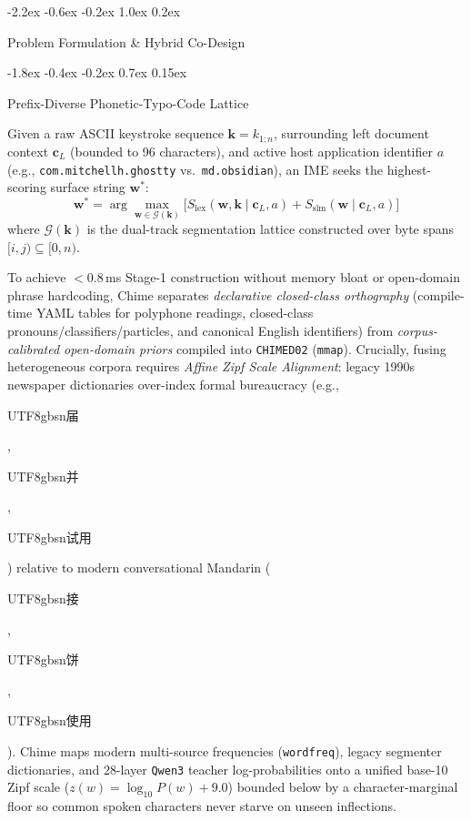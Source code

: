 \documentclass[10pt,twocolumn,letterpaper]{article}
\makeatletter
\newcommand{\zh}[1]{\begin{CJK*}{UTF8}{gbsn}{\small #1}\end{CJK*}}
\newcommand{\zh}[1]{#1}
\renewcommand\section{\@startsection {section}{1}{\z@}%
  {-2.2ex \@plus -0.6ex \@minus -0.2ex}%
  {1.0ex \@plus 0.2ex}%
  {\normalfont\large\bfseries\raggedright}}
\renewcommand\subsection{\@startsection{subsection}{2}{\z@}%
  {-1.8ex \@plus -0.4ex \@minus -0.2ex}%
  {0.7ex \@plus 0.15ex}%
  {\normalfont\normalsize\fontsize{10.8}{13}\selectfont\bfseries\raggedright}}
\makeatother
\begin{document}
\section{Problem Formulation \& Hybrid Co-Design}\label{sec:formulation}

\subsection{Prefix-Diverse Phonetic-Typo-Code Lattice}

Given a raw ASCII keystroke sequence $\bm{k} = k_{1:n}$, surrounding left document context $\bm{c}_L$ (bounded to 96 characters), and active host application identifier $a$ (e.g., \texttt{com.mitchellh.ghostty} vs.\ \texttt{md.obsidian}), an IME seeks the highest-scoring surface string $\bm{w}^*$:
\begin{equation}\label{eq:joint}
  \bm{w}^* = \arg\max_{\bm{w} \in \mathcal{G}(\bm{k})} \Big[ S_{\text{lex}}(\bm{w}, \bm{k} \mid \bm{c}_L, a) + S_{\text{slm}}(\bm{w} \mid \bm{c}_L, a) \Big]
\end{equation}
where $\mathcal{G}(\bm{k})$ is the dual-track segmentation lattice constructed over byte spans $[i, j) \subseteq [0, n)$.

To achieve $< 0.8$\,ms Stage-1 construction without memory bloat or open-domain phrase hardcoding, Chime separates \emph{declarative closed-class orthography} (compile-time YAML tables for polyphone readings, closed-class pronouns/classifiers/particles, and canonical English identifiers) from \emph{corpus-calibrated open-domain priors} compiled into \texttt{CHIMED02} (\texttt{mmap}). Crucially, fusing heterogeneous corpora requires \emph{Affine Zipf Scale Alignment}: legacy 1990s newspaper dictionaries over-index formal bureaucracy (e.g., \zh{届}, \zh{并}, \zh{试用}) relative to modern conversational Mandarin (\zh{接}, \zh{饼}, \zh{使用}). Chime maps modern multi-source frequencies (\texttt{wordfreq}), legacy segmenter dictionaries, and 28-layer \texttt{Qwen3} teacher log-probabilities onto a unified base-10 Zipf scale ($z(w) = \log_{10} P(w) + 9.0$) bounded below by a character-marginal floor so common spoken characters never starve on unseen inflections.
\end{document}
